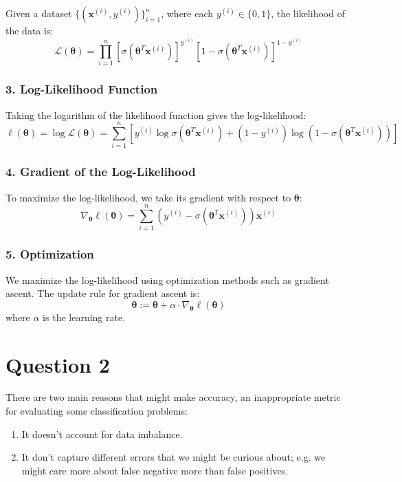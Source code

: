\documentclass[a4paper,12pt]{article}
\begin{document}
Given a dataset $\{(\mathbf{x}^{(i)}, y^{(i)})\}_{i=1}^n$, where each $y^{(i)} \in \{0,1\}$, the likelihood of the data is:
\[
\mathcal{L}(\boldsymbol{\theta}) = \prod_{i=1}^{n} \left[ \sigma(\boldsymbol{\theta}^T \mathbf{x}^{(i)}) \right]^{y^{(i)}} \left[ 1 - \sigma(\boldsymbol{\theta}^T \mathbf{x}^{(i)}) \right]^{1 - y^{(i)}}
\]

\subsubsection*{3. Log-Likelihood Function}

Taking the logarithm of the likelihood function gives the log-likelihood:
\[
\ell(\boldsymbol{\theta}) = \log \mathcal{L}(\boldsymbol{\theta}) = \sum_{i=1}^{n} \left[ y^{(i)} \log \sigma(\boldsymbol{\theta}^T \mathbf{x}^{(i)}) + (1 - y^{(i)}) \log (1 - \sigma(\boldsymbol{\theta}^T \mathbf{x}^{(i)})) \right]
\]

\subsubsection*{4. Gradient of the Log-Likelihood}

To maximize the log-likelihood, we take its gradient with respect to $\boldsymbol{\theta}$:
\[
\nabla_{\boldsymbol{\theta}} \ell(\boldsymbol{\theta}) = \sum_{i=1}^{n} \left( y^{(i)} - \sigma(\boldsymbol{\theta}^T \mathbf{x}^{(i)}) \right) \mathbf{x}^{(i)}
\]

\subsubsection*{5. Optimization}

We maximize the log-likelihood using optimization methods such as gradient ascent. The update rule for gradient ascent is:
\[
\boldsymbol{\theta} := \boldsymbol{\theta} + \alpha \cdot \nabla_{\boldsymbol{\theta}} \ell(\boldsymbol{\theta})
\]
where $\alpha$ is the learning rate.

\section*{Question 2}
There are two main reasons that might make accuracy, an inappropriate metric for evaluating some classification problems:
\begin{enumerate}
    \item It doesn't account for data imbalance.
    \item It don't capture different errors that we might be curious about; e.g. we might care more about false negative more than false positives.
\end{enumerate}
\end{document}
